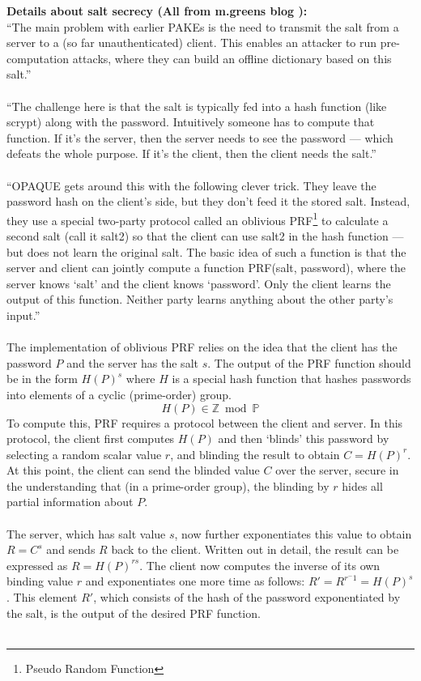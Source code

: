 \documentclass[11pt]{article}
\let\oldcite=\cite
\renewcommand\cite[1]{\ifthenelse{\equal{#1}{NEEDED}}{[citation~needed]}{\oldcite{#1}}}
\begin{document}
\textbf{Details about salt secrecy (All from m.greens blog \cite{green2018pake}):}\\
``The main problem with earlier PAKEs is the need to transmit the salt from a server to a (so far unauthenticated) client. This enables an attacker to run pre-computation attacks, where they can build an offline dictionary based on this salt.''\\\\
``The challenge here is that the salt is typically fed into a hash function (like scrypt) along with the password. Intuitively someone has to compute that function. If it’s the server, then the server needs to see the password — which defeats the whole purpose. If it’s the client, then the client needs the salt.''\\\\
``OPAQUE gets around this with the following clever trick. They leave the password hash on the client’s side, but they don’t feed it the stored salt. Instead, they use a special two-party protocol called an oblivious PRF\footnote{Pseudo Random Function} to calculate a second salt (call it salt2) so that the client can use salt2 in the hash function — but does not learn the original salt.
The basic idea of such a function is that the server and client can jointly compute a function PRF(salt, password), where the server knows `salt' and the client knows `password'. Only the client learns the output of this function. Neither party learns anything about the other party’s input.''\\\\
The implementation of oblivious PRF relies on the idea that the client has the password $P$ and the server has the salt $s$.
The output of the PRF function should be in the form $H(P)^s$ where $H$ is a special hash function that hashes passwords into elements of a cyclic (prime-order) group.
$$H(P) \in \mathbb{Z} \bmod \mathbb{P}$$
To compute this, PRF requires a protocol between the client and server. In this protocol, the client first computes $H(P)$ and then `blinds' this password by selecting a random scalar value $r$, and blinding the result to obtain $C=H(P)^r$. At this point, the client can send the blinded value $C$ over the server, secure in the understanding that (in a prime-order group), the blinding by $r$ hides all partial information about $P$.\\\\
The server, which has salt value $s$, now further exponentiates this value to obtain $R=C^s$ and sends $R$ back to the client. Written out in detail, the result can be expressed as $R=H(P)^{rs}$. The client now computes the inverse of its own binding value $r$ and exponentiates one more time as follows: $R'=R^{r^-1}=H(P)^s$. This element $R'$, which consists of the hash of the password exponentiated by the salt, is the output of the desired PRF function.\\\\
\end{document}
